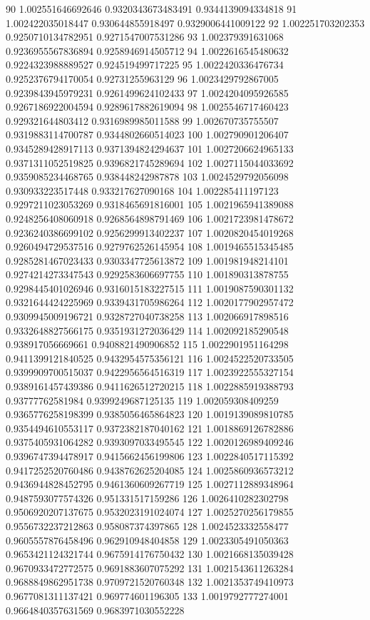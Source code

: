 90	1.002551646692646	0.9320343673483491	0.9344139094334818
91	1.002422035018447	0.930644855918497	0.9329006441009122
92	1.002251703202353	0.9250710134782951	0.9271547007531286
93	1.002379391631068	0.9236955567836894	0.9258946914505712
94	1.0022616545480632	0.9224323988889527	0.924519499717225
95	1.0022420336476734	0.9252376794170054	0.92731255963129
96	1.0023429792867005	0.9239843945979231	0.9261499624102433
97	1.0024204095926585	0.9267186922004594	0.9289617882619094
98	1.0025546717460423	0.929321644803412	0.9316989985011588
99	1.002670735755507	0.9319883114700787	0.9344802660514023
100	1.002790901206407	0.9345289428917113	0.9371394824294637
101	1.0027206624965133	0.9371311052519825	0.9396821745289694
102	1.0027115044033692	0.9359085234468765	0.938448242987878
103	1.0024529792056098	0.930933223517448	0.933217627090168
104	1.002285411197123	0.9297211023053269	0.9318465691816001
105	1.0021965941389088	0.9248256408060918	0.9268564898791469
106	1.0021723981478672	0.9236240386699102	0.9256299913402237
107	1.0020820454019268	0.9260494729537516	0.9279762526145954
108	1.0019465515345485	0.9285281467023433	0.9303347725613872
109	1.001981948214101	0.9274214273347543	0.9292583606697755
110	1.001890313878755	0.9298445401026946	0.9316015183227515
111	1.0019087590301132	0.9321644424225969	0.9339431705986264
112	1.0020177902957472	0.9309945009196721	0.9328727040738258
113	1.002066917898516	0.9332648827566175	0.9351931272036429
114	1.002092185290548	0.938917056669661	0.9408821490906852
115	1.0022901951164298	0.9411399121840525	0.9432954575356121
116	1.0024522520733505	0.9399909700515037	0.9422956564516319
117	1.0023922555327154	0.9389161457439386	0.9411626512720215
118	1.0022885919388793	0.93777762581984	0.9399249687125135
119	1.002059308409259	0.9365776258198399	0.9385056465864823
120	1.0019139089810785	0.9354494610553117	0.9372382187040162
121	1.0018869126782886	0.9375405931064282	0.9393097033495545
122	1.0020126989409246	0.9396747394478917	0.9415662456199806
123	1.0022840517115392	0.9417252520760486	0.9438762625204085
124	1.0025860936573212	0.9436944828452795	0.9461360609267719
125	1.0027112889348964	0.9487593077574326	0.951331517159286
126	1.0026410282302798	0.9506920207137675	0.9532023191024074
127	1.0025270256179855	0.9556732237212863	0.958087374397865
128	1.0024523332558477	0.9605557876458496	0.962910948404858
129	1.0023305491050363	0.9653421124321744	0.9675914176750432
130	1.0021668135039428	0.9670933472772575	0.9691883607075292
131	1.0021543611263284	0.9688849862951738	0.9709721520760348
132	1.0021353749410973	0.9677081311137421	0.969774601196305
133	1.0019792777274001	0.9664840357631569	0.9683971030552228
